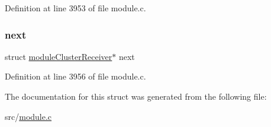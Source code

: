 Definition at line 3953 of file module.\+c.

\mbox{\label{structmodule_cluster_receiver_aaa93837daad4aea905b795397a966c68}} 
\subsubsection{\texorpdfstring{next}{next}}
{\footnotesize\ttfamily struct \hyperlink{structmodule_cluster_receiver}{module\+Cluster\+Receiver}$\ast$ next}



Definition at line 3956 of file module.\+c.



The documentation for this struct was generated from the following file\+:\begin{DoxyCompactItemize}
\item 
src/\hyperlink{module_8c}{module.\+c}\end{DoxyCompactItemize}
